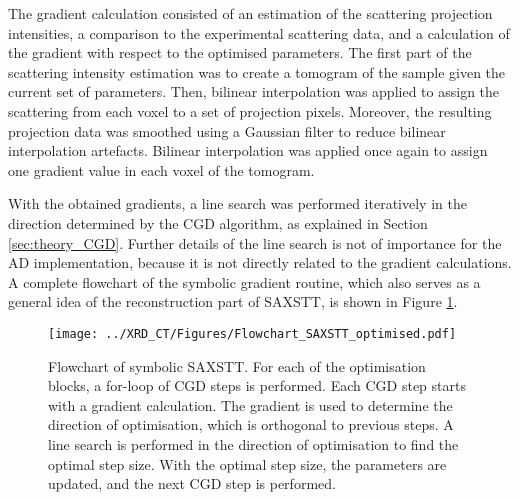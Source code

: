 The gradient calculation consisted of an estimation of the scattering projection intensities, a comparison to the experimental scattering data,
and a calculation of the gradient with respect to the optimised parameters.
The first part of the scattering intensity estimation was to create a tomogram of the sample given the current set of parameters.
Then, bilinear interpolation was applied to assign the scattering from each voxel to a set of projection pixels.
Moreover, the resulting projection data was smoothed using a Gaussian filter to reduce bilinear interpolation artefacts.
Bilinear interpolation was applied once again to assign one gradient value in each voxel of the tomogram. %

With the obtained gradients, a line search was performed iteratively in the direction determined by the CGD algorithm, as explained in Section \ref{sec:theory_CGD}.
Further details of the line search is not of importance for the AD implementation, because it is not directly related to the gradient calculations.
A complete flowchart of the symbolic gradient routine, which also serves as a general idea of the reconstruction part of SAXSTT, is shown in Figure \ref{fig:flowchart_SAXSTT}.



\begin{figure}
    \centering
    \texttt{[image: ../XRD\_CT/Figures/Flowchart\_SAXSTT\_optimised.pdf]} %
    \caption{Flowchart of symbolic SAXSTT.
        For each of the optimisation blocks, a for-loop of CGD steps is performed.
        Each CGD step starts with a gradient calculation.
        The gradient is used to determine the direction of optimisation, which is orthogonal to previous steps.
        A line search is performed in the direction of optimisation to find the optimal step size.
        With the optimal step size, the parameters are updated, and the next CGD step is performed.
    }
    \label{fig:flowchart_SAXSTT}
\end{figure}

